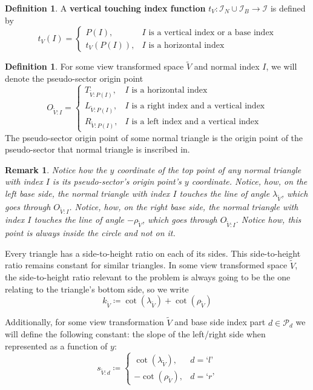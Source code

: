 \documentclass[a4paper,12pt]{article}
\newcommand{\HSindexpart}[1]{\text{`}#1\text{'}}
\newcommand{\HSview}[1][V]{\widetilde{#1}}
\newcommand{\HST}[1][I]{T_{\HSview:#1}}
\newcommand{\HSL}[1][I]{L_{\HSview:#1}}
\newcommand{\HSR}[1][I]{R_{\HSview:#1}}
\newcommand{\HSO}[1][I]{O_{\HSview:#1}}
\newcommand{\HSlambda}{\lambda_{\HSview}}
\newcommand{\HSrho}{\rho_{\HSview}}
\newcommand{\HSk}{k_{\HSview}}
\newcommand{\HSs}[1][d]{s_{\HSview:#1}}
\newtheorem*{remark}{Remark}
\theoremstyle{definition}
\newtheorem{definition}[theorem]{Definition}
\theoremstyle{plain}
\begin{document}
	\begin{definition}
		A \textbf{vertical touching index function} $t_V : \mathcal{I}_N \cup \mathcal{I}_B \to \mathcal{I}$ is defined by
		$$t_V(I) = \begin{cases}
			P(I),      & I \text{ is a vertical index or a base index}\\
			t_V(P(I)), & I \text{ is a horizontal index}
		\end{cases}$$
	\end{definition}
	
	\begin{definition}
		For some view transformed space $\HSview$ and normal index $I$, we will denote the pseudo-sector origin point
		$$\HSO = \begin{cases}
			\HST[P(I)], & I \text{ is a horizontal index}\\
			\HSL[P(I)], & I \text{ is a right index and a vertical index}\\
			\HSR[P(I)], & I \text{ is a left index and a vertical index}
		\end{cases}$$
		The pseudo-sector origin point of some normal triangle is the origin point of the pseudo-sector that normal
		triangle is inscribed in.
	\end{definition}

	\begin{remark}
		Notice how the $y$ coordinate of the top point of any normal triangle with index $I$ is its pseudo-sector's origin point's $y$ coordinate.
		Notice, how, on the left base side, the normal triangle with index $I$ touches the line of angle $\HSlambda$, which goes through $\HSO$.
		Notice, how, on the right base side, the normal triangle with index $I$ touches the line of angle $-\HSrho$, which goes through $\HSO$.
		Notice how, this point is always inside the circle and not on it.
	\end{remark}
	

	Every triangle has a side-to-height ratio on each of its sides. This side-to-height ratio remains constant for similar triangles.
	In some view transformed space $\HSview$, the side-to-height ratio relevant to the problem is always going to be the
	one relating to the triangle's bottom side, so we write
	$$\HSk \coloneqq \cot\left(\HSlambda\right) + \cot\left(\HSrho\right)$$

	Additionally, for some view transformation $\HSview$ and base side index part $d \in \mathcal{P}_d$
	we will define the following constant: the slope of the left/right side when represented as a function of $y$:
	$$\HSs \coloneqq \begin{cases}\cot\left(\HSlambda\right),& d = \HSindexpart{l}\\-\cot\left(\HSrho\right),& d = \HSindexpart{r}\end{cases}$$
	
\end{document}
